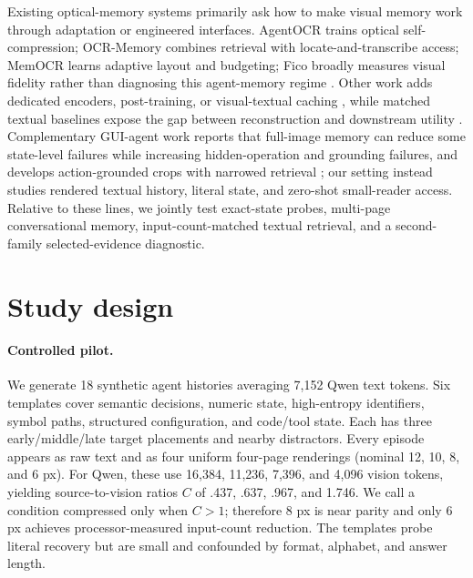 \documentclass{article}
\begin{document}
Existing optical-memory systems primarily ask how to make visual memory work through adaptation or engineered interfaces. AgentOCR trains optical self-compression; OCR-Memory combines retrieval with locate-and-transcribe access; MemOCR learns adaptive layout and budgeting; Fico broadly measures visual fidelity rather than diagnosing this agent-memory regime \citep{feng2026agentocr,li2026ocrmemory,shi2026memocr,tu2026fico}. Other work adds dedicated encoders, post-training, or visual-textual caching \citep{wei2025deepseekocr,cheng2026glyph,liang2026vizomem}, while matched textual baselines expose the gap between reconstruction and downstream utility \citep{lee2025bad}. Complementary GUI-agent work reports that full-image memory can reduce some state-level failures while increasing hidden-operation and grounding failures, and develops action-grounded crops with narrowed retrieval \citep{choi2026naive}; our setting instead studies rendered textual history, literal state, and zero-shot small-reader access. Relative to these lines, we jointly test exact-state probes, multi-page conversational memory, input-count-matched textual retrieval, and a second-family selected-evidence diagnostic.

\section{Study design}

\paragraph{Controlled pilot.}
We generate 18 synthetic agent histories averaging 7,152 Qwen text tokens. Six templates cover semantic decisions, numeric state, high-entropy identifiers, symbol paths, structured configuration, and code/tool state. Each has three early/middle/late target placements and nearby distractors. Every episode appears as raw text and as four uniform four-page renderings (nominal 12, 10, 8, and 6 px). For Qwen, these use 16,384, 11,236, 7,396, and 4,096 vision tokens, yielding source-to-vision ratios $C$ of .437, .637, .967, and 1.746. We call a condition compressed only when $C>1$; therefore 8 px is near parity and only 6 px achieves processor-measured input-count reduction. The templates probe literal recovery but are small and confounded by format, alphabet, and answer length.
\end{document}
